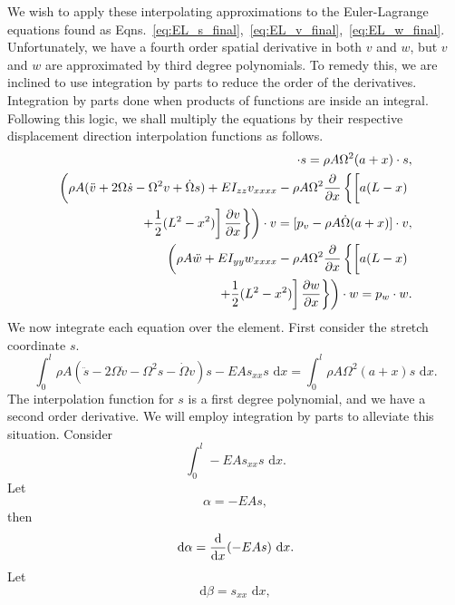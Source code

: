 We wish to apply these interpolating approximations to the Euler-Lagrange equations found as Eqns.~\ref{eq:EL_s_final},~\ref{eq:EL_v_final},~\ref{eq:EL_w_final}. Unfortunately, we have a fourth order spatial derivative in both $v$ and $w$, but $v$ and $w$ are approximated by third degree polynomials. To remedy this, we are inclined to use integration by parts to reduce the order of the derivatives. Integration by parts done when products of functions are inside an integral. Following this logic, we shall multiply the equations by their respective displacement direction interpolation functions as follows.
\begin{eqnarray}
[\rho A(\ddot s - 2\Omega\dot v-\Omega^2s-\dot\Omega v)-EAs_{xx}]\cdot s = \rho A\Omega^2(a+x)\cdot s, \\
\left(\rho A(\ddot v + 2\Omega\dot s-\Omega^2v+\dot\Omega s)+EI_{zz}v_{xxxx}-\rho A\Omega^2\frac{\partial}{\partial x}\left\lbrace\left[a(L-x)\vphantom{\frac{0}{0}}\right.\right.\right.\\
\left.\left.\left.+\frac{1}{2}(L^2-x^2)\right]\frac{\partial v}{\partial x}\right\rbrace\right)\cdot v = [p_v - \rho A\dot\Omega(a+x)]\cdot v, \nonumber \\
\left(\rho A\ddot w+EI_{yy}w_{xxxx}-\rho A\Omega^2\frac{\partial}{\partial x}\left\lbrace\left[a(L-x)\vphantom{\frac{0}{0}}\right.\right.\right.\\
\left.\left.\left.+\frac{1}{2}(L^2-x^2)\right]\frac{\partial w}{\partial x}\right\rbrace\right)\cdot w = p_w\cdot w. \nonumber
\end{eqnarray}
We now integrate each equation over the element. First consider the stretch coordinate $s$.
\begin{equation}
\int_0^l \rho A(\ddot s-2\Omega\dot v-\Omega^2s-\dot\Omega v)s-EAs_{xx}s \text{ d}x = \int_0^l \rho A\Omega^2(a+x)s\text{ d}x.
\end{equation}
The interpolation function for $s$ is a first degree polynomial, and we have a second order derivative. We will employ integration by parts to alleviate this situation.
Consider
\begin{equation}
\int_0^l -EAs_{xx}s\text{ d}x. 
\end{equation}
Let
\begin{equation}
\alpha = -EAs,
\end{equation}
then
\begin{equation}
\text d\alpha = \frac{\text d}{\text dx}(-EAs)\text{ d}x.
\end{equation}
Let
\begin{equation}
\text{d}\beta = s_{xx}\text{ d}x,
\end{equation}
